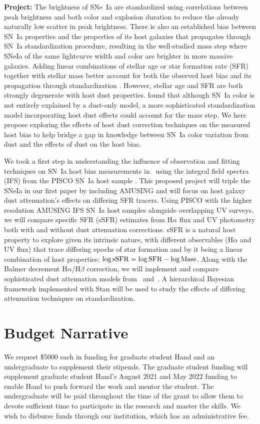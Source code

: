 \documentclass[modern]{aastex63}
\begin{document}
{\bf Project:}
The brightness of SNe~Ia are standardized using correlations between peak brightness and both color and explosion duration to reduce the already naturally low scatter in peak brightness.
There is also an established bias between SN~Ia properties and the properties of its host galaxies that propagates through SN~Ia standardization procedure, resulting in the well-studied mass step \citep{Sullivan2010} where SNeIa of the same lightcurve width and color are brighter in more massive galaxies.
Adding linear combinations of stellar age or star formation rate (SFR) together with stellar mass better account for both the observed host bias and its propagation through standardization \citep{Rigault2018,Rose2021}.
However, stellar age and SFR are both strongly degenerate with host dust properties.
\cite{Brout2021} found that although SN~Ia color is not entirely explained by a dust-only model, a more sophisticated standardization model incorporating host dust effects could account for the mass step.
We here propose exploring the effects of host dust correction techniques on the measured host bias to help bridge a gap in knowledge between SN~Ia color variation from dust and the effects of dust on the host bias.

We took a first step in understanding the influence of observation and fitting techniques on SN~Ia host bias measurements in~\cite{Hand2021} using the integral field spectra (IFS) from the PISCO SN~Ia host sample \citep{Galbany2018}.  
This proposed project will triple the SNeIa in our first paper by including AMUSING \citep{Galbany2016a} and will focus on host galaxy dust attenuation's effects on differing SFR tracers. 
Using PISCO with the higher resolution AMUSING IFS SN~Ia host samples alongside overlapping UV surveys, we will compare specific SFR (sSFR) estimates from H$\alpha$ flux and UV photometry both with and without dust attenuation corrections.
sSFR is a natural host property to explore given its intrinsic nature, with different observables (H$\alpha$ and UV flux) that trace differing epochs of star formation and by it being a linear combination of host properties: $\log{\rm sSFR} = \log{\rm SFR} - \log{\rm Mass}$.
Along with the Balmer decrement H$\alpha$/H$\beta$ correction, we will implement and compare sophisticated dust attenuation models from~\cite{Salim2018} and~\cite{Narayanan2018}.  
A hierarchical Bayesian framework implemented with Stan will be used to study the effects of differing attenuation techniques on standardization.

\section{Budget Narrative}
We request \$5000 each in funding for graduate student Hand and an undergraduate to supplement their stipends.
The graduate student funding will supplement graduate student Hand's August 2021 and May 2022 funding to enable Hand to push forward the work and mentor the student.
The undergraduate will be paid throughout the time of the grant to allow them to devote sufficient time to participate in the research and master the skills.
We wish to disburse funds through our institution, which has an administrative fee.

\newpage


\end{document}
